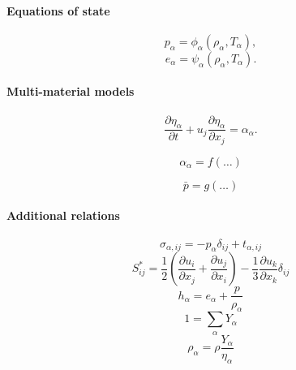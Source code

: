 \documentclass[oneside,a4paper,11pt]{report}
\begin{document}
\paragraph{Equations of state}

\begin{equation*}
    p_\alpha = \phi_\alpha (\rho_\alpha, T_\alpha),
\end{equation*}
\begin{equation*}
    e_\alpha = \psi_\alpha (\rho_\alpha, T_\alpha).
\end{equation*}

\paragraph{Multi-material models}
\begin{equation}
    \frac{\partial \eta_\alpha}{\partial t} + u_j \frac{\partial \eta_\alpha}{\partial x_j} = \alpha_\alpha.
\end{equation}

\begin{equation*}
    \alpha_\alpha = f(\dots)
\end{equation*}

\begin{equation*}
    \bar{p} = g(\dots)
\end{equation*}

\paragraph{Additional relations}

\begin{equation*}
    \sigma_{\alpha,ij} = -p_\alpha \delta_{ij} + t_{\alpha,ij}
\end{equation*}
\begin{equation*}
    S^*_{ij} = \frac{1}{2} \left ( \frac{\partial u_i}{\partial x_j} + \frac{\partial u_j}{\partial x_i} \right ) - \frac{1}{3} \frac{\partial u_k}{\partial x_k} \delta_{ij}
\end{equation*}
\begin{equation*}
    h_\alpha = e_\alpha + \frac{p}{\rho_\alpha}
\end{equation*}
\begin{equation*}
    1 = \sum_\alpha Y_\alpha 
\end{equation*}
\begin{equation*}
    \rho_\alpha = \rho \frac{Y_\alpha}{\eta_\alpha}
\end{equation*}
\end{document}
